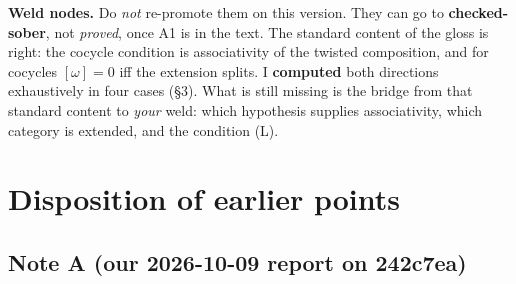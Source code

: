 \documentclass[11pt]{article}
\begin{document}
\textbf{Weld nodes.} Do \emph{not} re-promote them on this version. They can go to
\textbf{checked-sober}, not \emph{proved}, once A1 is in the text. The standard content of the gloss
is right: the cocycle condition is associativity of the twisted composition, and for cocycles
$[\omega]=0$ iff the extension splits. I \textbf{computed} both directions exhaustively in four cases
(\S3). What is still missing is the bridge from that standard content to \emph{your} weld: which
hypothesis supplies associativity, which category is extended, and the condition (L).

\section{Disposition of earlier points}
\subsection*{Note A (our 2026-10-09 report on 242c7ea)}
\end{document}
